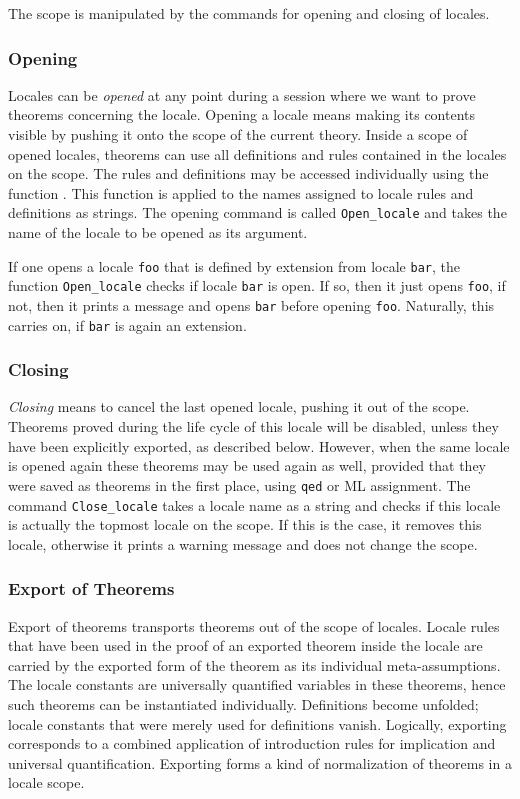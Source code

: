 The scope is manipulated by the commands for opening and closing of locales. 

\subsubsection{Opening}
Locales can be \emph{opened} at any point during a session where
we want to prove theorems concerning the locale.  Opening a locale means
making its contents visible by pushing it onto the scope of the current
theory.  Inside a scope of opened locales, theorems can use all definitions and
rules contained in the locales on the scope.  The rules and definitions may
be accessed individually using the function .  This function is
applied to the names assigned to locale rules and definitions as
strings.  The opening command is called \texttt{Open\_locale} and takes the 
name of the locale to be opened as its argument.

If one opens a locale \texttt{foo} that is defined by extension from locale
\texttt{bar}, the function \texttt{Open\_locale} checks if locale \texttt{bar}
is open.  If so, then it just opens \texttt{foo}, if not, then it prints a
message and opens \texttt{bar} before opening \texttt{foo}.  Naturally, this
carries on, if \texttt{bar} is again an extension.

\subsubsection{Closing}

\emph{Closing} means to cancel the last opened locale, pushing it out of the
scope.  Theorems proved during the life cycle of this locale will be disabled,
unless they have been explicitly exported, as described below.  However, when
the same locale is opened again these theorems may be used again as well,
provided that they were saved as theorems in the first place, using
\texttt{qed} or ML assignment.  The command \texttt{Close\_locale} takes a
locale name as a string and checks if this locale is actually the topmost
locale on the scope.  If this is the case, it removes this locale, otherwise
it prints a warning message and does not change the scope.

\subsubsection{Export of Theorems}
\label{sec:locale-export}

Export of theorems transports theorems out of the scope of locales.  Locale
rules that have been used in the proof of an exported theorem inside the
locale are carried by the exported form of the theorem as its individual
meta-assumptions.  The locale constants are universally quantified variables
in these theorems, hence such theorems can be instantiated individually.
Definitions become unfolded; locale constants that were merely used for
definitions vanish.  Logically, exporting corresponds to a combined
application of introduction rules for implication and universal
quantification.  Exporting forms a kind of normalization of theorems in a
locale scope.

